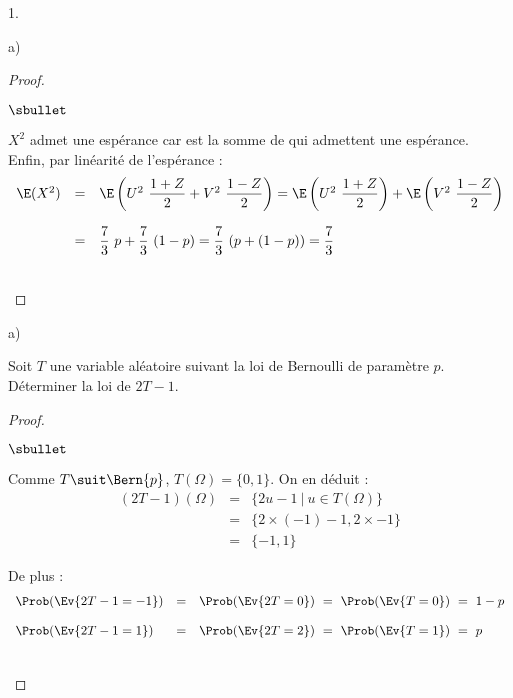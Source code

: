 \documentclass[11pt]{article}%
\begin{document}
\begin{noliste}{1.}
\begin{noliste}{a)}
\begin{proof}
\begin{noliste}{$\sbullet$}
      \item $X^2$ admet une espérance car est la somme de \var qui
        admettent une espérance.\\
        Enfin, par linéarité de l'espérance :
        \[
        \begin{array}{rcl}
          \E(X^2) & = & \E\left(U^2 \ \dfrac{1 + Z}{2} + V^2 \ \dfrac{1 -
              Z}{2}\right) = \E\left(U^2 \ \dfrac{1 + Z}{2}\right) +
          \E\left(V^2 \ \dfrac{1 - Z}{2}\right) \\[.6cm]
          & = & \dfrac{7}{3} \ p + \dfrac{7}{3} \ (1-p) = \dfrac{7}{3}
          \ (p+(1-p)) = \dfrac{7}{3}
        \end{array}
        \]        
      \end{noliste}
      ~\\[-1.2cm]
    \end{proof}

\end{noliste}

\item
  \begin{noliste}{a)}
    \setlength{\itemsep}{2mm}
  \item Soit $T$ une variable aléatoire suivant la loi de Bernoulli de
    paramètre $p$.\\
    Déterminer la loi de $2T-1$.

    \begin{proof}~
      \begin{noliste}{$\sbullet$}
      \item Comme $T \suit \Bern{p}$, $T(\Omega) = \{0,
        1\}$. On en déduit :
        \[
        \begin{array}{rcl}
          (2T-1)(\Omega) & = & \{ 2 u - 1 \ | \ u \in T(\Omega) \} 
          \\[.2cm]
          & = & \{2 \times (-1) - 1, 2 \times - 1\} 
          \\[.2cm]
          & = & \{-1, 1\}
        \end{array}
        \]

      \item De plus :
        \[
        \begin{array}{lcl}
          \Prob(\Ev{2T-1 = -1}) & = & \Prob(\Ev{2T = 0}) \ = \ \Prob(\Ev{T = 0})
          \ = \ 1 - p \\[.4cm]
          \Prob(\Ev{2T-1 = 1}) & = & \Prob(\Ev{2T = 2}) \ = \ \Prob(\Ev{T = 1})
          \ = \ p
        \end{array}
        \]
      \end{noliste}
      ~\\[-1.4cm]
    \end{proof}


\end{noliste}
\end{noliste}
\end{document}
